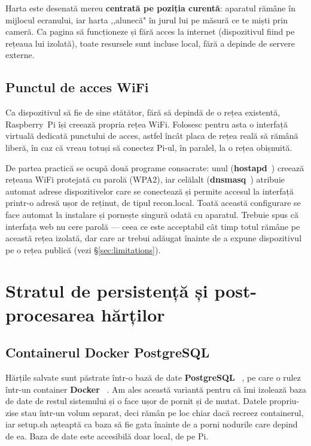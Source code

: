 \documentclass[a4paper,12pt,twoside,openany]{report}
\renewcommand{\texttt}[1]{\textnormal{#1}}
\begin{document}
Harta este desenată mereu \textbf{centrată pe poziția curentă}: aparatul
rămâne în mijlocul ecranului, iar harta ,,alunecă" în jurul lui pe măsură ce
te miști prin cameră. Ca pagina să funcționeze și fără acces la internet
(dispozitivul fiind pe rețeaua lui izolată), toate resursele sunt incluse
local, fără a depinde de servere externe.

\section{Punctul de acces WiFi}
\label{sec:wifi-ap}

Ca dispozitivul să fie de sine stătător, fără să depindă de o rețea
existentă, Raspberry~Pi își creează propria rețea WiFi. Folosesc pentru asta o
interfață virtuală dedicată punctului de acces, astfel încât placa de rețea
reală să rămână liberă, în caz că vreau totuși să conectez Pi-ul, în paralel,
la o rețea obișnuită.

De partea practică se ocupă două programe consacrate: unul
(\textbf{hostapd}~\cite{hostapd}) creează rețeaua WiFi protejată cu parolă
(WPA2), iar celălalt (\textbf{dnsmasq}~\cite{dnsmasq}) atribuie automat adrese
dispozitivelor care se conectează și permite accesul la interfață printr-o
adresă ușor de reținut, de tipul \texttt{recon.local}. Toată această configurare
se face automat la instalare și pornește singură odată cu aparatul. Trebuie
spus că interfața web nu cere parolă — ceea ce este acceptabil cât timp totul
rămâne pe această rețea izolată, dar care ar trebui adăugat înainte de a expune
dispozitivul pe o rețea publică (vezi §\ref{sec:limitations}).

\clearpage

\chapter{Stratul de persistență și post-procesarea hărților}
\label{cap:db}

\section{Containerul Docker PostgreSQL}
\label{sec:postgres-docker}

Hărțile salvate sunt păstrate într-o bază de date \textbf{PostgreSQL}%
~\cite{postgresql}, pe care o rulez într-un container \textbf{Docker}%
~\cite{docker}. Am ales această variantă pentru că îmi izolează baza de date
de restul sistemului și o face ușor de pornit și de mutat. Datele propriu-zise
stau într-un volum separat, deci rămân pe loc chiar dacă recreez containerul,
iar \texttt{setup.sh} așteaptă ca baza să fie gata înainte de a porni nodurile
care depind de ea. Baza de date este accesibilă doar local, de pe Pi.
\end{document}
